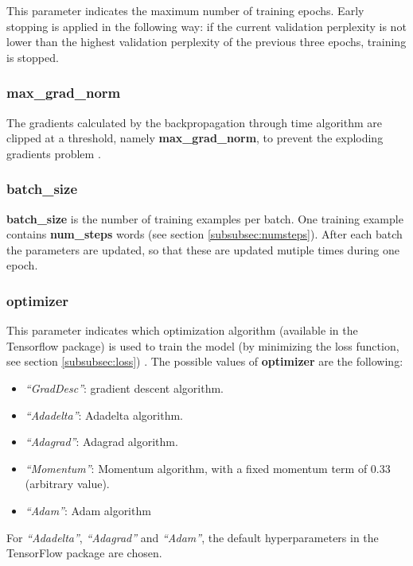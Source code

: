 \documentclass[10pt,a4paper,titlepage]{article}
\begin{document}
This parameter indicates the maximum number of training epochs. Early stopping is applied in the following way: if the current validation perplexity is not lower than the highest validation perplexity of the previous three epochs, training is stopped.

\subsubsection{max\_grad\_norm}

The gradients calculated by the backpropagation through time algorithm are clipped at a threshold, namely \textbf{max\_grad\_norm}, to prevent the exploding gradients problem \cite{bptt,exp}.

\subsubsection{batch\_size}

\textbf{batch\_size} is the number of training examples per batch. One training example contains \textbf{num\_steps} words (see section \ref{subsubsec:numsteps}). After each batch the parameters are updated, so that these are updated mutiple times during one epoch.

\subsubsection{optimizer}
\label{subsubsec:opt}

This parameter indicates which optimization algorithm (available in the Tensorflow package) is used to train the model (by minimizing the loss function, see section \ref{subsubsec:loss}) \cite{opt}. The possible values of \textbf{optimizer} are the following:

\begin{itemize}

	\item \textit{``GradDesc''}: gradient descent algorithm.
	\item \textit{``Adadelta''}: Adadelta algorithm.
	\item \textit{``Adagrad''}: Adagrad algorithm.
	\item \textit{``Momentum''}: Momentum algorithm, with a fixed momentum term of 0.33 (arbitrary value).
	\item \textit{``Adam''}: Adam algorithm

\end{itemize}

\noindent
For \textit{``Adadelta''}, \textit{``Adagrad''} and \textit{``Adam''}, the default hyperparameters in the TensorFlow package are chosen. 
\end{document}
